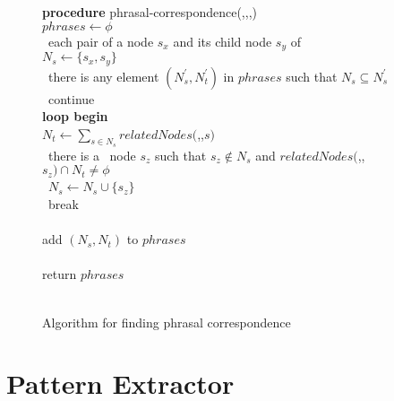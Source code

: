 \begin{figure*}
\raggedright
\small
{\bf procedure} phrasal-correspondence(\Ds,\Dt,\Mup,\Mdw) \bfbegin\ \\
\hspace{5mm} $phrases \leftarrow \phi$ \\
\hspace{5mm} \bffor\ each pair of a node $s_x$ and its child node $s_y$ of \Ds \bfbegin\  \\
\hspace{10mm} $N_s \leftarrow \{s_x,s_y\}$ \\
\hspace{10mm} \bfif\ there is any element $(N_s^{\prime},N_t^{\prime})$ in
$phrases$ such that $N_s\subseteq N_s^{\prime}$ \bfthen\ continue \\
\hspace{10mm} {\bf loop begin} \\
\hspace{15mm} $N_t \leftarrow \sum_{s\in N_s}relatedNodes($\Mup,\Mdw,$s)$ \\
\hspace{15mm} \bfif\ there is a \Ds\ node $s_z$ such that $s_z\not\in N_s$ and
$relatedNodes($\Mup,\Mdw,$s_z)\cap N_t\neq\phi$ \\
\hspace{20mm} \bfthen\ $N_s \leftarrow N_s\cup\{s_z\}$ \\
\hspace{20mm} \bfelse\ break \\
\hspace{10mm} \bfend {}\\
\hspace{10mm} add $(N_s,N_t)$ to $phrases$ \\
\hspace{5mm} \bfend {}\\
\hspace{5mm} return $phrases$  \\
\bfend\
\normalsize
\caption{Algorithm for finding phrasal correspondence}
\label{alg:phrasalmap}
\end{figure*}

\section{Pattern Extractor}
\label{sec:findpat}

